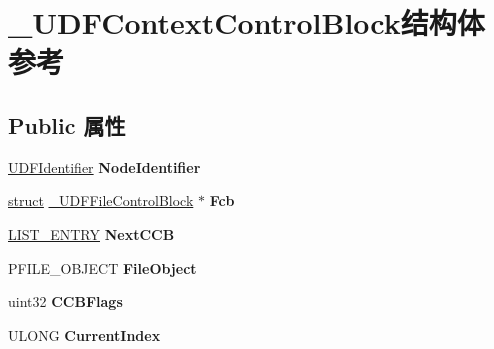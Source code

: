 \hypertarget{struct___u_d_f_context_control_block}{}\section{\+\_\+\+U\+D\+F\+Context\+Control\+Block结构体 参考}
\label{struct___u_d_f_context_control_block}
\subsection*{Public 属性}
\begin{DoxyCompactItemize}
\item 
\mbox{\label{struct___u_d_f_context_control_block_aa03866bfcb06e4df8feb528c0bc6d797}} 
\hyperlink{struct___u_d_f_identifier}{U\+D\+F\+Identifier} {\bfseries Node\+Identifier}
\item 
\mbox{\label{struct___u_d_f_context_control_block_af731e6779ea91146a8d8dff0fa74fd65}} 
\hyperlink{interfacestruct}{struct} \hyperlink{struct___u_d_f_file_control_block}{\+\_\+\+U\+D\+F\+File\+Control\+Block} $\ast$ {\bfseries Fcb}
\item 
\mbox{\label{struct___u_d_f_context_control_block_a08bda64e36bfe31ee72b71598dd7c3c2}} 
\hyperlink{struct___l_i_s_t___e_n_t_r_y}{L\+I\+S\+T\+\_\+\+E\+N\+T\+RY} {\bfseries Next\+C\+CB}
\item 
\mbox{\label{struct___u_d_f_context_control_block_a00151a229d00c06281e7e9606ccabe4d}} 
P\+F\+I\+L\+E\+\_\+\+O\+B\+J\+E\+CT {\bfseries File\+Object}
\item 
\mbox{\label{struct___u_d_f_context_control_block_a6ed2d8e1427a3a34e468300456d6b5ee}} 
uint32 {\bfseries C\+C\+B\+Flags}
\item 
\mbox{\label{struct___u_d_f_context_control_block_a914c161e1b34d7312c68a027f7dd0396}} 
U\+L\+O\+NG {\bfseries Current\+Index}
\item 
\mbox{\label{struct___u_d_f_context_control_block_ae97d2e9386656fac12dc0b31b598b535}} 

\end{DoxyCompactItemize}
